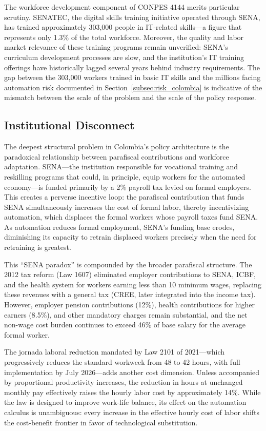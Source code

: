 The workforce development component of CONPES 4144 merits particular scrutiny. SENATEC, the digital skills training initiative operated through SENA, has trained approximately 303,000 people in IT-related skills---a figure that represents only 1.3\% of the total workforce. Moreover, the quality and labor market relevance of these training programs remain unverified: SENA's curriculum development processes are slow, and the institution's IT training offerings have historically lagged several years behind industry requirements. The gap between the 303,000 workers trained in basic IT skills and the millions facing automation risk documented in Section~\ref{subsec:risk_colombia} is indicative of the mismatch between the scale of the problem and the scale of the policy response.

\subsection{Institutional Disconnect}
\label{subsec:disconnect}

The deepest structural problem in Colombia's policy architecture is the paradoxical relationship between parafiscal contributions and workforce adaptation. SENA---the institution responsible for vocational training and reskilling programs that could, in principle, equip workers for the automated economy---is funded primarily by a 2\% payroll tax levied on formal employers. This creates a perverse incentive loop: the parafiscal contribution that funds SENA simultaneously increases the cost of formal labor, thereby incentivizing automation, which displaces the formal workers whose payroll taxes fund SENA. As automation reduces formal employment, SENA's funding base erodes, diminishing its capacity to retrain displaced workers precisely when the need for retraining is greatest.

This ``SENA paradox'' is compounded by the broader parafiscal structure. The 2012 tax reform (Law 1607) eliminated employer contributions to SENA, ICBF, and the health system for workers earning less than 10 minimum wages, replacing these revenues with a general tax (CREE, later integrated into the income tax). However, employer pension contributions (12\%), health contributions for higher earners (8.5\%), and other mandatory charges remain substantial, and the net non-wage cost burden continues to exceed 46\% of base salary for the average formal worker.

The jornada laboral reduction mandated by Law 2101 of 2021---which progressively reduces the standard workweek from 48 to 42 hours, with full implementation by July 2026---adds another cost dimension. Unless accompanied by proportional productivity increases, the reduction in hours at unchanged monthly pay effectively raises the hourly labor cost by approximately 14\%. While the law is designed to improve work-life balance, its effect on the automation calculus is unambiguous: every increase in the effective hourly cost of labor shifts the cost-benefit frontier in favor of technological substitution.

